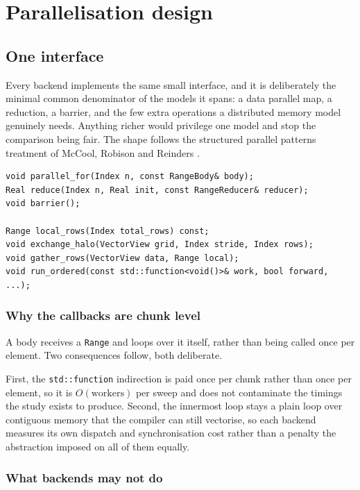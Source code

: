 \chapter{Parallelisation design}
\label{ch:parallelisation}

\section{One interface}

Every backend implements the same small interface, and it is deliberately the
minimal common denominator of the models it spans: a data parallel map, a
reduction, a barrier, and the few extra operations a distributed memory model
genuinely needs. Anything richer would privilege one model and stop the
comparison being fair. The shape follows the structured parallel patterns
treatment of McCool, Robison and Reinders \cite[Ch.~3, 5]{mccool2012}.

\begin{lstlisting}[caption={The parallelism interface, abbreviated}]
void parallel_for(Index n, const RangeBody& body);
Real reduce(Index n, Real init, const RangeReducer& reducer);
void barrier();

Range local_rows(Index total_rows) const;
void exchange_halo(VectorView grid, Index stride, Index rows);
void gather_rows(VectorView data, Range local);
void run_ordered(const std::function<void()>& work, bool forward, ...);
\end{lstlisting}

\subsection{Why the callbacks are chunk level}

A body receives a \texttt{Range} and loops over it itself, rather than being
called once per element. Two consequences follow, both deliberate.

First, the \texttt{std::function} indirection is paid once per chunk rather than
once per element, so it is $O(\text{workers})$ per sweep and does not
contaminate the timings the study exists to produce. Second, the innermost loop
stays a plain loop over contiguous memory that the compiler can still vectorise,
so each backend measures its own dispatch and synchronisation cost rather than a
penalty the abstraction imposed on all of them equally.

\subsection{What backends may not do}

